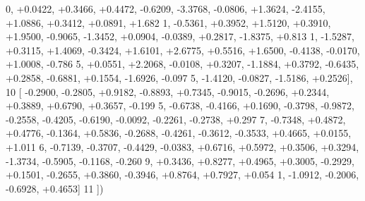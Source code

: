 \begin{DoxyCode}
      0, +0.0422, +0.3466, +0.4472, -0.6209, -3.3768, -0.0806, +1.3624, -2.4155, +1.0886, +0.3412, +0.0891, +1.682
      1, -0.5361, +0.3952, +1.5120, +0.3910, +1.9500, -0.9065, -1.3452, +0.0904, -0.0389, +0.2817, -1.8375, +0.813
      1, -1.5287, +0.3115, +1.4069, -0.3424, +1.6101, +2.6775, +0.5516, +1.6500, -0.4138, -0.0170, +1.0008, -0.786
      5, +0.0551, +2.2068, -0.0108, +0.3207, -1.1884, +0.3792, -0.6435, +0.2858, -0.6881, +0.1554, -1.6926, -0.097
      5, -1.4120, -0.0827, -1.5186, +0.2526],
10 [ -0.2900, -0.2805, +0.9182, -0.8893, +0.7345, -0.9015, -0.2696, +0.2344, +0.3889, +0.6790, +0.3657, -0.199
      5, -0.6738, -0.4166, +0.1690, -0.3798, -0.9872, -0.2558, -0.4205, -0.6190, -0.0092, -0.2261, -0.2738, +0.297
      7, -0.7348, +0.4872, +0.4776, -0.1364, +0.5836, -0.2688, -0.4261, -0.3612, -0.3533, +0.4665, +0.0155, +1.011
      6, -0.7139, -0.3707, -0.4429, -0.0383, +0.6716, +0.5972, +0.3506, +0.3294, -1.3734, -0.5905, -0.1168, -0.260
      9, +0.3436, +0.8277, +0.4965, +0.3005, -0.2929, +0.1501, -0.2655, +0.3860, -0.3946, +0.8764, +0.7927, +0.054
      1, -1.0912, -0.2006, -0.6928, +0.4653]
11 ])
\end{DoxyCode}
